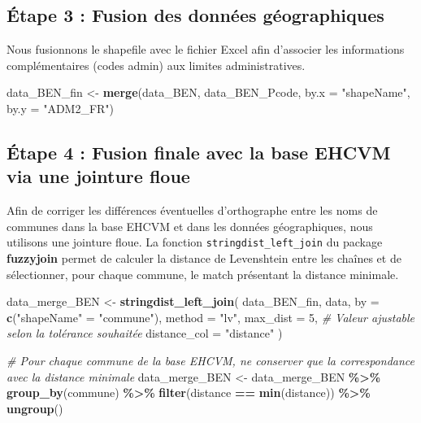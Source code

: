 \documentclass[
]{article}
\newenvironment{Shaded}{\begin{snugshade}}{\end{snugshade}}
\newcommand{\AttributeTok}[1]{\textcolor[rgb]{0.13,0.29,0.53}{#1}}
\newcommand{\CommentTok}[1]{\textcolor[rgb]{0.56,0.35,0.01}{\textit{#1}}}
\newcommand{\DecValTok}[1]{\textcolor[rgb]{0.00,0.00,0.81}{#1}}
\newcommand{\FunctionTok}[1]{\textcolor[rgb]{0.13,0.29,0.53}{\textbf{#1}}}
\newcommand{\NormalTok}[1]{#1}
\newcommand{\OtherTok}[1]{\textcolor[rgb]{0.56,0.35,0.01}{#1}}
\newcommand{\SpecialCharTok}[1]{\textcolor[rgb]{0.81,0.36,0.00}{\textbf{#1}}}
\newcommand{\StringTok}[1]{\textcolor[rgb]{0.31,0.60,0.02}{#1}}
\begin{document}
\hypertarget{uxe9tape-3-fusion-des-donnuxe9es-guxe9ographiques}{%
\subsection{Étape 3 : Fusion des données
géographiques}\label{uxe9tape-3-fusion-des-donnuxe9es-guxe9ographiques}}

Nous fusionnons le shapefile avec le fichier Excel afin d'associer les
informations complémentaires (codes admin) aux limites administratives.

\begin{Shaded}
\begin{Highlighting}[]
\NormalTok{data\_BEN\_fin }\OtherTok{\textless{}{-}} \FunctionTok{merge}\NormalTok{(data\_BEN, data\_BEN\_Pcode, }\AttributeTok{by.x =} \StringTok{"shapeName"}\NormalTok{, }\AttributeTok{by.y =} \StringTok{"ADM2\_FR"}\NormalTok{)}
\end{Highlighting}
\end{Shaded}

\hypertarget{uxe9tape-4-fusion-finale-avec-la-base-ehcvm-via-une-jointure-floue}{%
\subsection{Étape 4 : Fusion finale avec la base EHCVM via une jointure
floue}\label{uxe9tape-4-fusion-finale-avec-la-base-ehcvm-via-une-jointure-floue}}

Afin de corriger les différences éventuelles d'orthographe entre les
noms de communes dans la base EHCVM et dans les données géographiques,
nous utilisons une jointure floue. La fonction
\texttt{stringdist\_left\_join} du package \textbf{fuzzyjoin} permet de
calculer la distance de Levenshtein entre les chaînes et de
sélectionner, pour chaque commune, le match présentant la distance
minimale.

\begin{Shaded}
\begin{Highlighting}[]
\NormalTok{data\_merge\_BEN }\OtherTok{\textless{}{-}} \FunctionTok{stringdist\_left\_join}\NormalTok{(}
\NormalTok{  data\_BEN\_fin, data, }
  \AttributeTok{by =} \FunctionTok{c}\NormalTok{(}\StringTok{"shapeName"} \OtherTok{=} \StringTok{"commune"}\NormalTok{), }
  \AttributeTok{method =} \StringTok{"lv"}\NormalTok{, }
  \AttributeTok{max\_dist =} \DecValTok{5}\NormalTok{,         }\CommentTok{\# Valeur ajustable selon la tolérance souhaitée}
  \AttributeTok{distance\_col =} \StringTok{"distance"}
\NormalTok{)}

\CommentTok{\# Pour chaque commune de la base EHCVM, ne conserver que la correspondance avec la distance minimale}
\NormalTok{data\_merge\_BEN }\OtherTok{\textless{}{-}}\NormalTok{ data\_merge\_BEN }\SpecialCharTok{\%\textgreater{}\%}
  \FunctionTok{group\_by}\NormalTok{(commune) }\SpecialCharTok{\%\textgreater{}\%}
  \FunctionTok{filter}\NormalTok{(distance }\SpecialCharTok{==} \FunctionTok{min}\NormalTok{(distance)) }\SpecialCharTok{\%\textgreater{}\%}
  \FunctionTok{ungroup}\NormalTok{()}
\end{Highlighting}
\end{Shaded}
\end{document}
